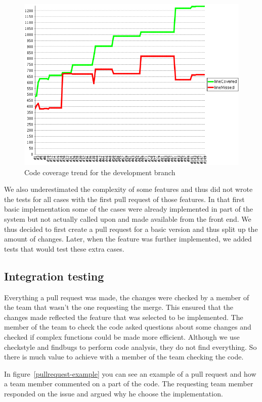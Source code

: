 \begin{figure}[h]
    \centering
    \includegraphics[width=\textwidth]{images/CodeCoverageTrendDev2}
    \caption{Code coverage trend for the development branch}
    \label{codecoveragetrenddev}
\end{figure}

We also underestimated the complexity of some features and thus did not wrote the tests for all cases with the first pull request of those features.
In that first basic implementation some of the cases were already implemented in part of the system but not actually called upon and made available from the front end.
We thus decided to first create a pull request for a basic version and thus split up the amount of changes.
Later, when the feature was further implemented, we added tests that would test these extra cases.

\subsection{Integration testing}
Everything a pull request was made, the changes were checked by a member of the team that wasn't the one requesting the merge.
This ensured that the changes made reflected the feature that was selected to be implemented.
The member of the team to check the code asked questions about some changes and checked if complex functions could be made more efficient.
Although we use checkstyle and findbugs to perform code analysis, they do not find everything.
So there is much value to achieve with a member of the team checking the code.

In figure~\ref{pullrequest-example} you can see an example of a pull request and how a team member commented on a part of the code.
The requesting team member responded on the issue and argued why he choose the implementation.

